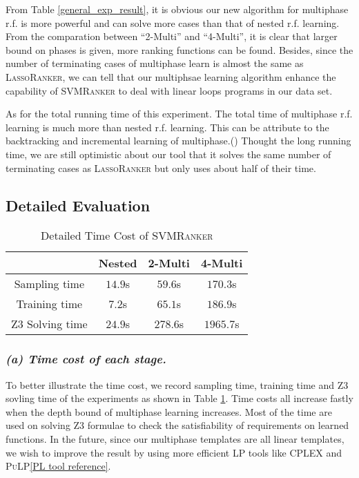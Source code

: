 \documentclass[UTF-8]{article}
\begin{document}
From Table \ref{general_exp_result}, it is obvious our new algorithm for multiphase r.f. is more powerful and can solve more cases than that of nested r.f. learning. From the comparation between ``2-Multi'' and ``4-Multi'', it is clear that larger bound on phases is given, more ranking functions can be found. Besides, since the number of terminating cases of multiphase learn is almost the same as \textsc{LassoRanker}, we can tell that our multiphsae learning algorithm enhance the capability of \textsc{SVMRanker} to deal with linear loops programs in our data set. 

As for the total running time of this experiment. The total time of multiphase r.f. learning is much more than nested r.f. learning. This can be attribute to the backtracking and incremental learning of multiphase.({\color{blue}{lx: Add description of backtracking and incremental learning if the phase bound is not mentioned previously :xl}}) Thought the long running time, we are still optimistic about our tool that it solves the same number of terminating cases as \textsc{LassoRanker} but only uses about half of their time.


\subsection{Detailed Evaluation}
\begin{table}
\centering
\begin{tabular}{c|c|c|c}

& Nested & 2-Multi & 4-Multi\\
\hline
Sampling time & $14.9$s& $59.6$s& $170.3$s \\
Training time & $7.2$s& $65.1$s& $186.9$s\\
Z3 Solving time & $24.9$s& $278.6$s& $1965.7$s\\

\end{tabular}
\caption{Detailed Time Cost of \textsc{SVMRanker}}
\label{detailed_time}
\end{table}


\subsubsection{
\textit{(a) Time cost of each stage.}}
To better illustrate the time cost, we record sampling time, training time and Z3 sovling time of the experiments as shown in Table \ref{detailed_time}. Time costs all increase fastly when the depth bound of multiphase learning increases. Most of the time are used on solving Z3 formulae to check the satisfiability of requirements on learned functions. In the future, since our multiphase templates are all linear templates, we wish to improve the result by using more efficient LP tools like \textsc{CPLEX} and \textsc{PuLP}\ref{PL tool reference}.
\end{document}
